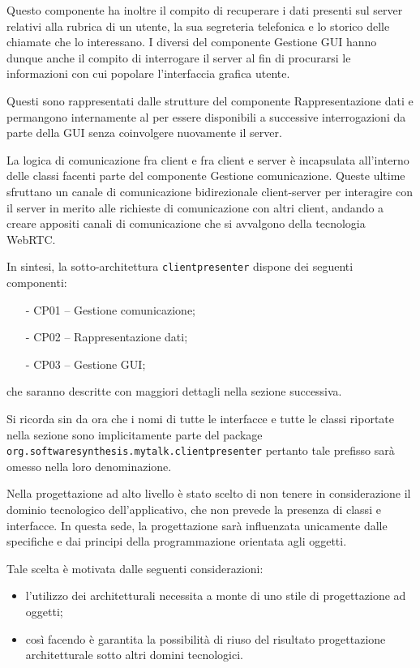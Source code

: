 Questo componente ha inoltre il compito di recuperare i dati presenti sul server relativi alla rubrica di un utente, la sua segreteria telefonica e lo storico delle chiamate che lo interessano. I diversi  del componente \textsf{Gestione GUI} hanno dunque anche il compito di interrogare il server al fin di procurarsi le informazioni con cui popolare l'interfaccia grafica utente.

Questi sono rappresentati dalle strutture del componente \textsf{Rappresentazione dati} e permangono internamente al  per essere disponibili a successive interrogazioni da parte della GUI senza coinvolgere nuovamente il server.

La logica di comunicazione fra client e fra client e server è incapsulata all'interno delle classi facenti parte del componente \textsf{Gestione comunicazione}. Queste ultime sfruttano un canale di comunicazione bidirezionale client-server per interagire con il server in merito alle richieste di comunicazione con altri client, andando a creare appositi canali di comunicazione che si avvalgono della tecnologia WebRTC\@.

In sintesi, la sotto-architettura \texttt{clientpresenter} dispone dei seguenti componenti:
\begin{itemize}[noitemsep,nolistsep]
	\item[-] \textsf{CP01 -- Gestione comunicazione};
	\item[-] \textsf{CP02 -- Rappresentazione dati};
	\item[-] \textsf{CP03 -- Gestione GUI};
\end{itemize}
che saranno descritte con maggiori dettagli nella sezione successiva.

Si ricorda sin da ora che i nomi di tutte le interfacce e tutte le classi riportate nella sezione sono implicitamente parte del package \texttt{org.softwaresynthesis.mytalk.clientpresenter} pertanto tale prefisso sarà omesso nella loro denominazione.

Nella progettazione ad alto livello è stato scelto di non tenere in considerazione il dominio tecnologico dell'applicativo, che non prevede la presenza di classi e interfacce. In questa sede, la progettazione sarà influenzata unicamente dalle specifiche e dai principi della programmazione orientata agli oggetti.

Tale scelta è motivata dalle seguenti considerazioni:
\begin{itemize}
   \item l'utilizzo dei  architetturali necessita a monte di uno stile di progettazione ad oggetti;
   \item così facendo è garantita la possibilità di riuso del risultato progettazione architetturale sotto altri domini tecnologici.
\end{itemize}

